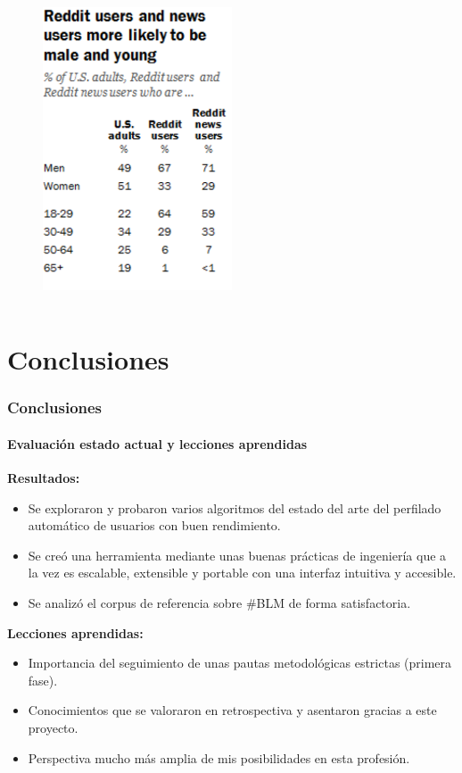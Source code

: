 \documentclass{beamer}
\begin{document}
\begin{frame}
\begin{columns}[T]
{\begin{column}{0.6\textwidth}
			\vspace{-0.75cm}
			\begin{figure}[H]
				\includegraphics[width=0.5\textwidth]{imaxes/estudio-reddit.pdf}
			\end{figure}
		\end{column}}
	\end{columns}
\end{frame}

\section{Conclusiones}

	\begin{frame}
			\frametitle{Conclusiones}
			\framesubtitle{Evaluación estado actual y lecciones aprendidas}
			\vspace{0cm}
			\textbf{Resultados:}
			\begin{itemize}
				\item Se exploraron y probaron varios algoritmos del estado del arte del perfilado automático de usuarios con buen rendimiento.
				\item Se creó una herramienta mediante unas buenas prácticas de ingeniería que a la vez es escalable, extensible y portable con una interfaz intuitiva y accesible.
				\item Se analizó el corpus de referencia sobre \#BLM de forma satisfactoria. 

			\end{itemize} 
			\pause
			\vspace{0.5cm}
			\textbf{Lecciones aprendidas:}
			\begin{itemize}
				\item Importancia del seguimiento de unas pautas metodológicas estrictas (primera fase).
				\item Conocimientos que se valoraron en retrospectiva y asentaron gracias a este proyecto.
				\item Perspectiva mucho más amplia de mis posibilidades en esta profesión.
			\end{itemize}
	\end{frame}
	
\end{document}
